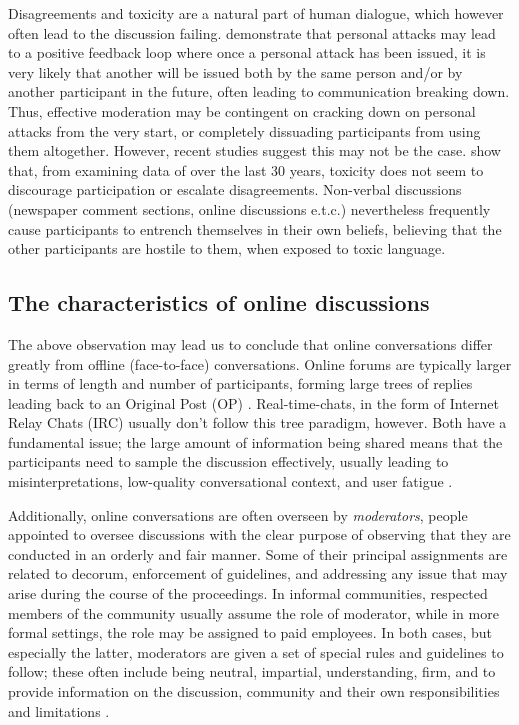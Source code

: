 Disagreements and toxicity are a natural part of human dialogue, which however often lead to the discussion failing. \citet{dekock2022disagree} demonstrate that personal attacks may lead to a positive feedback loop where once a personal attack has been issued, it is very likely that another will be issued both by the same person and/or by another participant in the future, often leading to communication breaking down. Thus, effective moderation may be contingent on cracking down on personal attacks from the very start, or completely dissuading participants from using them altogether. However, recent studies suggest this may not be the case. \citet{Avalle2024PersistentIP} show that, from examining data of over the last 30 years, toxicity does not seem to discourage participation or escalate disagreements. Non-verbal discussions (newspaper comment sections, online discussions e.t.c.) nevertheless frequently cause participants to entrench themselves in their own beliefs, believing that the other participants are hostile to them, when exposed to toxic language.

\subsection{The characteristics of online discussions}
\label{sec:background:arguments-online}

The above observation may lead us to conclude that online conversations differ greatly from offline (face-to-face) conversations. Online forums are typically larger in terms of length and number of participants, forming large trees of replies leading back to an Original Post (OP) \cite{boschi2021wordunderstandingsampleonline}. Real-time-chats, in the form of Internet Relay Chats (IRC) usually don't follow this tree paradigm, however. Both have a fundamental issue; the large amount of information being shared means that the participants need to sample the discussion effectively, usually leading to misinterpretations, low-quality conversational context, and user fatigue \cite{boschi2021wordunderstandingsampleonline}. 

Additionally, online conversations are often overseen by \textit{moderators}, people appointed to oversee discussions with the clear purpose of observing that they are conducted in an orderly and fair manner. Some of their principal assignments are related to decorum, enforcement of guidelines, and addressing any issue that may arise during the course of the proceedings. In informal communities, respected members of the community usually assume the role of moderator, while in more formal settings, the role may be assigned to paid employees. In both cases, but especially the latter, moderators are given a set of special rules and guidelines to follow; these often include being neutral, impartial, understanding, firm, and to provide information on the discussion, community and their own responsibilities and limitations \cite{Cornell_eRulemaking2017}.

